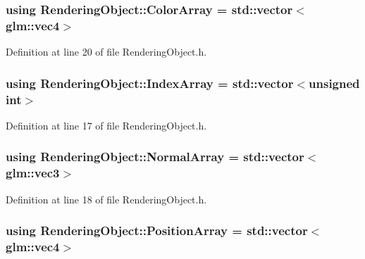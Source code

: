 \subsubsection[{Color\+Array}]{\setlength{\rightskip}{0pt plus 5cm}using {\bf Rendering\+Object\+::\+Color\+Array} =  std\+::vector$<$glm\+::vec4$>$}\label{class_rendering_object_a8a12e1f9be788d99af6c089e1c600022}


Definition at line 20 of file Rendering\+Object.\+h.

\hypertarget{class_rendering_object_a9931c88bca3384065c6691dfe1e60af1}{}
\subsubsection[{Index\+Array}]{\setlength{\rightskip}{0pt plus 5cm}using {\bf Rendering\+Object\+::\+Index\+Array} =  std\+::vector$<$unsigned int$>$}\label{class_rendering_object_a9931c88bca3384065c6691dfe1e60af1}


Definition at line 17 of file Rendering\+Object.\+h.

\hypertarget{class_rendering_object_a327c4d892de8d6138fb59afa6d078257}{}
\subsubsection[{Normal\+Array}]{\setlength{\rightskip}{0pt plus 5cm}using {\bf Rendering\+Object\+::\+Normal\+Array} =  std\+::vector$<$glm\+::vec3$>$}\label{class_rendering_object_a327c4d892de8d6138fb59afa6d078257}


Definition at line 18 of file Rendering\+Object.\+h.

\hypertarget{class_rendering_object_a1223b9cf03f2029b9c43d71042c2a18e}{}
\subsubsection[{Position\+Array}]{\setlength{\rightskip}{0pt plus 5cm}using {\bf Rendering\+Object\+::\+Position\+Array} =  std\+::vector$<$glm\+::vec4$>$}\label{class_rendering_object_a1223b9cf03f2029b9c43d71042c2a18e}


